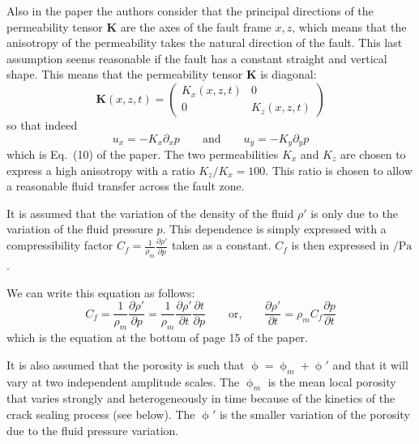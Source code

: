 Also in the paper the authors consider that the principal directions of the permeability
tensor ${\bm K}$ are the axes of the fault frame $x,z$, which means
that the anisotropy of the permeability takes the natural
direction of the fault. This last assumption seems reasonable
if the fault has a constant straight and vertical shape.
This means that the permeability tensor ${\bm K}$ is diagonal:
\begin{equation}
{\bm K}(x,z,t) = \left(\begin{array}{cc}
K_x(x,z,t) & 0 \\ 
0 & K_z(x,z,t)
\end{array}\right)
\label{eq:por22}
\end{equation}
so that indeed
\begin{equation}
u_x = -K_x \partial_x p
\qquad
\text{and}
\qquad
u_y = -K_y \partial_y p
\label{eq:por11}
\end{equation}
which is Eq.~(10) of the paper.
The two permeabilities $K_x$ and $K_z$ are chosen to express a high anisotropy with a ratio 
$K_z/K_x =100$. This ratio is chosen to allow a reasonable fluid transfer across the fault zone.

It is assumed that the variation of the density of the fluid $\rho'$ 
is only due to the variation of the fluid pressure $p$. This dependence is simply
expressed with a compressibility factor $C_f = \frac{1}{\rho_m}\frac{\partial \rho'}{\partial p} $
taken as a constant. $C_f$ is then expressed in $\si{\per\pascal}$.

We can write this equation as follows:
\begin{equation}
C_f = \frac{1}{\rho_m}\frac{\partial \rho'}{\partial p} = 
\frac{1}{\rho_m}\frac{\partial \rho'}{\partial t}\frac{\partial t}{\partial p}
\qquad
\text{or,}
\qquad
\frac{\partial \rho'}{\partial t} = \rho_m C_f  \frac{\partial p}{\partial t}
\label{eq:por20}
\end{equation}
which is the equation at the bottom of page 15 of the paper.

It is also assumed that the porosity is such that $\upphi=\upphi_m + \upphi'$
and that it will vary at two independent
amplitude scales. The $\upphi_m$ is the mean local porosity that
varies strongly and heterogeneously in time because of the
kinetics of the crack sealing process (see below). The $\upphi'$ is
the smaller variation of the porosity due to the fluid pressure variation.

